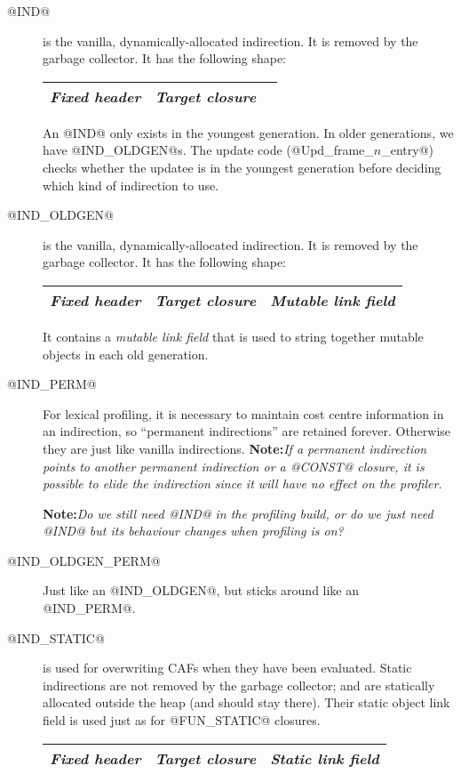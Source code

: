 \documentclass[11pt]{article}
\newcommand{\note}[1]{{{\bf Note:}\sl #1}}
\begin{document}
\begin{description}
\item[@IND@] is the vanilla, dynamically-allocated indirection.
It is removed by the garbage collector. It has the following
shape:
\begin{center}
\begin{tabular}{|l|l|l|}\hline
\emph{Fixed header} & \emph{Target closure} \\ \hline
\end{tabular}
\end{center}

An @IND@ only exists in the youngest generation.  In older
generations, we have @IND_OLDGEN@s.  The update code
(@Upd_frame_$n$_entry@) checks whether the updatee is in the youngest
generation before deciding which kind of indirection to use.

\item[@IND\_OLDGEN@] is the vanilla, dynamically-allocated indirection.
It is removed by the garbage collector. It has the following
shape:
\begin{center}
\begin{tabular}{|l|l|l|}\hline
\emph{Fixed header} & \emph{Target closure} & \emph{Mutable link field} \\ \hline
\end{tabular}
\end{center}
It contains a \emph{mutable link field} that is used to string together
mutable objects in each old generation.

\item[@IND\_PERM@]
For lexical profiling, it is necessary to maintain cost centre
information in an indirection, so ``permanent indirections'' are
retained forever.  Otherwise they are just like vanilla indirections.
\note{If a permanent indirection points to another permanent
indirection or a @CONST@ closure, it is possible to elide the indirection
since it will have no effect on the profiler.}

\note{Do we still need @IND@ in the profiling build, or do we just
need @IND@ but its behaviour changes when profiling is on?}

\item[@IND\_OLDGEN\_PERM@]
Just like an @IND_OLDGEN@, but sticks around like an @IND_PERM@.

\item[@IND\_STATIC@] is used for overwriting CAFs when they have been
evaluated.  Static indirections are not removed by the garbage
collector; and are statically allocated outside the heap (and should
stay there).  Their static object link field is used just as for
@FUN_STATIC@ closures.

\begin{center}
\begin{tabular}{|l|l|l|}
\hline
\emph{Fixed header} & \emph{Target closure} & \emph{Static link field} \\
\hline
\end{tabular}
\end{center}

\end{description}
\end{document}
